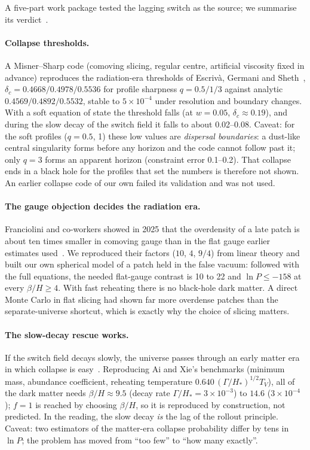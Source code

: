 \documentclass[11pt,a4paper]{article}
\begin{document}
A five-part work package tested the lagging switch as the source; we summarise its verdict~\cite{wpbh}.

\paragraph{Collapse thresholds.} A Misner--Sharp code (comoving slicing, regular centre, artificial viscosity fixed in advance) reproduces
the radiation-era thresholds of Escriv\`a, Germani and Sheth~\cite{escriva}, $\delta_c=0.4668/0.4978/0.5536$ for profile sharpness
$q=0.5/1/3$ against analytic $0.4569/0.4892/0.5532$, stable to $5\times10^{-4}$ under resolution and boundary changes. With a soft equation
of state the threshold falls (at $w=0.05$, $\delta_c\approx0.19$), and during the slow decay of the switch field it falls to about 0.02--0.08.
Caveat: for the soft profiles ($q=0.5$, 1) these low values are \emph{dispersal boundaries}: a dust-like central singularity forms before any
horizon and the code cannot follow past it; only $q=3$ forms an apparent horizon (constraint error 0.1--0.2). That collapse ends in a black hole
for the profiles that set the numbers is therefore not shown. An earlier collapse code of our own failed its validation and was not used.

\paragraph{The gauge objection decides the radiation era.} Franciolini and co-workers showed in 2025 that the overdensity of a late patch
is about ten times smaller in comoving gauge than in the flat gauge earlier estimates used~\cite{franciolini}. We reproduced their factors
($10$, $4$, $9/4$) from linear theory and built our own spherical model of a patch held in the false vacuum: followed with the full
equations, the needed flat-gauge contrast is 10 to 22 and $\ln P\le-158$ at every $\beta/H\ge4$. With fast reheating there is no
black-hole dark matter. A direct Monte Carlo in flat slicing had shown far more overdense patches than the separate-universe shortcut,
which is exactly why the choice of slicing matters.

\paragraph{The slow-decay rescue works.} If the switch field decays slowly, the universe passes through an early matter era in which
collapse is easy~\cite{aixie,harada2016}. Reproducing Ai and Xie's benchmarks (minimum mass, abundance coefficient, reheating temperature
$0.640\,(\Gamma/H_*)^{1/2}T_V$), all of the dark matter needs $\beta/H\approx9.5$ (decay rate $\Gamma/H_*=3\times10^{-3}$) to $14.6$
($3\times10^{-4}$); $f=1$ is reached by choosing $\beta/H$, so it is reproduced by construction, not predicted. In the reading, the slow decay \emph{is} the lag of the rollout principle. Caveat: two estimators of the matter-era
collapse probability differ by tens in $\ln P$; the problem has moved from ``too few'' to ``how many exactly''.
\end{document}
